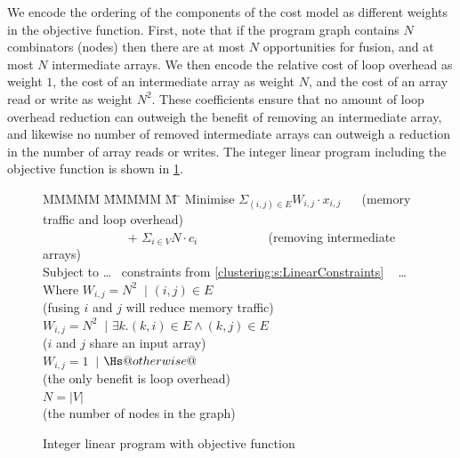 We encode the ordering of the components of the cost model as different weights in the objective function.
First, note that if the program graph contains $N$ combinators (nodes) then there are at most $N$ opportunities for fusion, and at most $N$ intermediate arrays.
We then encode the relative cost of loop overhead as weight $1$, the cost of an intermediate array as weight $N$, and the cost of an array read or write as weight $N^2$.
These coefficients ensure that no amount of loop overhead reduction can outweigh the benefit of removing an intermediate array, and likewise no number of removed intermediate arrays can outweigh a reduction in the number of array reads or writes.
The integer linear program including the objective function is shown in \cref{fig:clustering:ilp-obj}.

\begin{figure}
\begin{tabbing}
MMMMM   \= MMMMM \= M \= \kill
Minimise   \>     $\Sigma_{(i,j) \in E} W_{i,j} \cdot x_{i,j}$   
                        ~~ (memory traffic and loop overhead)
\\ ~~~~~~~~~~~~~ $+$ \> $\Sigma_{i \in V} N \cdot c_i$
                        ~~~~~~~~~~ (removing intermediate arrays)
\\[1ex]
   Subject to  \> \ldots ~ constraints from \cref{clustering:s:LinearConstraints} ~ \ldots 
\\ Where   \> $W_{i,j} = N^2$ \> $~|$ \> $(i,j) \in E $         
\\         \> \> \> (fusing $i$ and $j$ will reduce memory traffic)         
\\         \> $W_{i,j} = N^2$ \> $~|$ \> $\exists k. (k,i) \in E \wedge (k,j) \in E $     
\\         \> \> \> ($i$ and $j$ share an input array)
\\         \> $W_{i,j} = 1$   \> $~|$ \> $\Hs@otherwise@$
\\         \> \> \> (the only benefit is loop overhead)
\\         \> $N = |V|$
\\         \> \> \> (the number of nodes in the graph)
\end{tabbing}
\caption{Integer linear program with objective function}
\label{fig:clustering:ilp-obj}
\end{figure}




